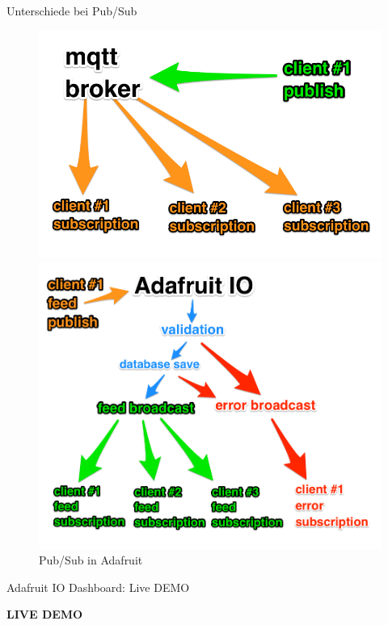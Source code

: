 \begin{frame}{Unterschiede bei Pub/Sub}
	\begin{figure}
	\centering
	\parbox{5cm}{
		\includegraphics[scale=0.19]{7-datenaustausch/img/mqtt-pubsub}
		\caption{Pub/Sub in MQTT}
		\label{fig:pubsubmqtt}
		}
	\qquad
	\begin{minipage}{5cm}
		\includegraphics[scale=0.15]{7-datenaustausch/img/adafruit-pubsub}
		\caption{Pub/Sub in Adafruit}
		\label{fig:pubsubadafruit}
	\end{minipage}
	\end{figure}
\end{frame}


\begin{frame}{Adafruit IO Dashboard: Live DEMO}
      \centering
  	\begin{Huge}
      		\textbf{LIVE DEMO}
	\end{Huge}
\end{frame}



